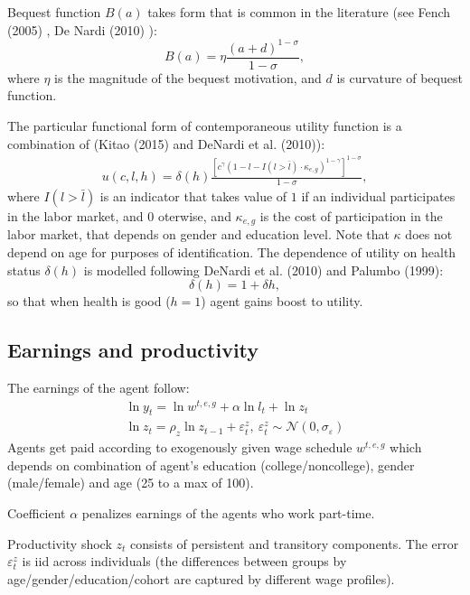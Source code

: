 \documentclass[
10pt, %
a4paper, %
oneside, %
headinclude,footinclude, %
BCOR5mm, %
]{scrartcl}
\begin{document}
Bequest function $B(a)$ takes form that is common in the literature (see Fench (2005) \cite{French2005}, De Nardi (2010) \cite{DeNardi2010}):
\begin{equation}
B(a) = \eta\frac{(a+d)^{1-\sigma}}{1-\sigma},
\end{equation}
where $\eta$ is the magnitude of the bequest motivation, and $d$ is curvature of bequest function.

The particular functional form of contemporaneous utility function  is a combination of (Kitao (2015)\cite{Kitao2015} and DeNardi et al. (2010)\cite{DeNardi2010}):
\begin{eqnarray*}
u(c,l,h) = \delta(h)\frac{[c^{\gamma}(1-l-I(l>\bar{l})\cdot \kappa_{e,g})^{1-\gamma}]^{1-\sigma}}{1-\sigma},
\end{eqnarray*}
where $I(l>\bar{l})$ is an indicator that takes value of $1$ if an individual participates in the labor market, and $0$ oterwise, and $\kappa_{e,g}$ is the cost of participation in the labor market, that depends on gender and education level. Note that $\kappa$ does not depend on age for purposes of identification. The dependence of utility on health status  $\delta(h)$ is modelled following DeNardi et al. (2010)\cite{DeNardi2010} and Palumbo (1999)\cite{Palumbo1999}:
\begin{equation*}
\delta(h) = 1+\delta h,
\end{equation*}
so that when health is good ($h=1$) agent gains boost to utility.

\subsection{Earnings and productivity}
The earnings of the agent follow:
\begin{eqnarray*}
\ln y_t = \ln w^{t,e,g}+\alpha \ln l_t + \ln z_t \\
\ln z_t = \rho_z \ln z_{t-1} +  \varepsilon_t^z, \ \varepsilon_t^z\sim \mathcal{N}(0,\sigma_{\varepsilon})
\end{eqnarray*}
Agents get paid according to exogenously given wage schedule $w^{t,e,g}$ which depends on combination of agent's education (college/noncollege), gender (male/female) and age (25 to a max of 100).

Coefficient $\alpha$ penalizes earnings of the agents who work part-time.

Productivity shock $z_t$ consists of persistent and transitory components. The error $\varepsilon_t^z$ is iid across individuals (the differences between groups by age/gender/education/cohort are captured by different wage profiles).
\end{document}
